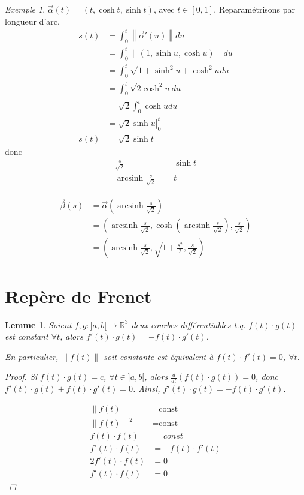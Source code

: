 \documentclass{report}
\newtheorem*{lem}{Lemme}
\theoremstyle{definition}
\theoremstyle{remark}
\newtheorem*{exem}{Exemple}
\def\RR{\mathbb{R}}
\def\arcsinh{\operatorname{arcsinh}}
\newcommand*{\norme}[1]{\left\|#1\right\|}
\begin{document}
	\begin{exem}
		$\vec\alpha(t) = (t, \cosh t, \sinh t)$, avec $t\in[0,1]$. Reparam\'etrisons par longueur d'arc.
		\begin{align*}
			s(t)&= \int_{0}^{t} \norme{\vec\alpha'(u)}du\\
			&= \int_{0}^{t} \norme{(1, \sinh u, \cosh u)} du\\
			&= \int_{0}^{t} \sqrt{1+\sinh^2u+\cosh^2u} du\\
			&= \int_{0}^{t} \sqrt{2\cosh^2u} du\\
			&= \sqrt{2} \int_{0}^{t} \cosh u du\\
			&= \left. \sqrt{2} \sinh u \right|_{0}^{t}\\
			s(t)&= \sqrt{2}\sinh t
		\end{align*}
		donc
		\begin{align*}
			\frac{s}{\sqrt{2}}&= \sinh t\\
			\arcsinh\frac{s}{\sqrt{2}}&= t
		\end{align*}

		\begin{align*}
			\vec\beta(s)&= \vec\alpha(\arcsinh\frac{s}{\sqrt{2}})\\
			&= \left( \arcsinh\frac{s}{\sqrt{2}}, \cosh\left( \arcsinh\frac{s}{\sqrt{2}} \right), \frac{s}{\sqrt{2}} \right)\\
			&= \left( \arcsinh\frac{s}{\sqrt{2}}, \sqrt{1+\frac{s^2}{2}}, \frac{s}{\sqrt{2}} \right)
		\end{align*}
	\end{exem}

	\section{Rep\`ere de Frenet}
	\begin{lem}
		Soient $f,g: ]a,b[ \to \RR^3$ deux courbes diff\'erentiables t.q. $f(t) \cdot g(t)$ est constant $\forall t$, alors $f'(t) \cdot g(t) = -f(t) \cdot g'(t)$.

		En particulier, $\norme{f(t)}$ soit constante est \'equivalent \`a $f(t) \cdot f'(t)=0$, $\forall t$.
		\begin{proof}
			Si $f(t) \cdot g(t)=c$, $\forall t \in ]a,b[$, alors $\frac{d}{dt}(f(t) \cdot g(t)) = 0$, donc $f'(t) \cdot g(t) + f(t) \cdot g'(t)=0$. Ainsi, $f'(t) \cdot g(t) = -f(t) \cdot g'(t)$.

			\begin{align*}
				\norme{f(t)}&= \text{const}\\
				\norme{f(t)}^2&= \text{const}\\
				f(t) \cdot f(t)&= const\\
				f'(t) \cdot f(t)&= -f(t) \cdot f'(t)\\
				2f'(t) \cdot f(t)&= 0\\
				f'(t) \cdot f(t)&= 0
			\end{align*}
		\end{proof}
	\end{lem}
\end{document}

